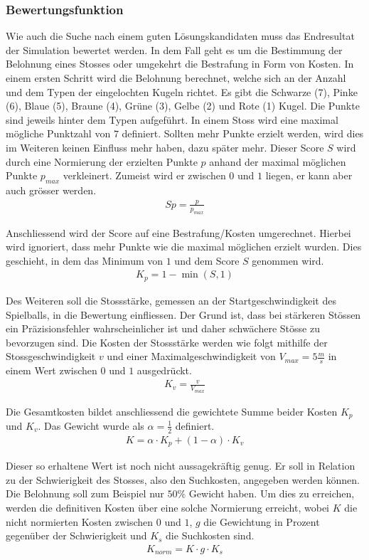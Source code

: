 \subsubsection{Bewertungsfunktion}
Wie auch die Suche nach einem guten Lösungskandidaten muss das Endresultat der Simulation bewertet werden.
In dem Fall geht es um die Bestimmung der Belohnung eines Stosses oder umgekehrt die Bestrafung in Form von Kosten.
In einem ersten Schritt wird die Belohnung berechnet, welche sich an der Anzahl und dem Typen der eingelochten Kugeln richtet.
Es gibt die Schwarze (7), Pinke (6), Blaue (5), Braune (4), Grüne (3), Gelbe (2) und Rote (1) Kugel.
Die Punkte sind jeweils hinter dem Typen aufgeführt.
In einem Stoss wird eine maximal mögliche Punktzahl von $7$ definiert.
Sollten mehr Punkte erzielt werden, wird dies im Weiteren keinen Einfluss mehr haben, dazu später mehr.
Dieser Score $S$ wird durch eine Normierung der erzielten Punkte $p$ anhand der
maximal möglichen Punkte $p_{max}$ verkleinert. Zumeist wird er zwischen $0$ und $1$ liegen, er kann aber auch grösser werden.
\begin{align}
    S{p} = \frac{p}{p_{max}}
\end{align}

Anschliessend wird der Score auf eine Bestrafung/Kosten umgerechnet. Hierbei wird ignoriert, dass mehr Punkte wie die maximal
möglichen erzielt wurden. Dies geschieht, in dem das Minimum von $1$ und dem Score $S$ genommen wird.
\begin{align}
    K_{p} = 1 - \min{(S, 1)}
\end{align}

Des Weiteren soll die Stossstärke, gemessen an der Startgeschwindigkeit des Spielballs, in die Bewertung einfliessen.
Der Grund ist, dass bei stärkeren Stössen ein Präzisionsfehler wahrscheinlicher ist und daher schwächere Stösse zu bevorzugen sind.
Die Kosten der Stossstärke werden wie folgt mithilfe der Stossgeschwindigkeit $v$ und einer
Maximalgeschwindigkeit von $V_{max} = 5\frac{m}{s}$ in einem Wert zwischen $0$ und $1$ ausgedrückt.
\begin{align}
    K_{v} = \frac{v}{V_{max}}
\end{align}

Die Gesamtkosten bildet anschliessend die gewichtete Summe beider Kosten $K_p$ und $K_v$.
Das Gewicht wurde als $\alpha = \frac{1}{2}$ definiert.
\begin{align}
    K = \alpha \cdot K_p + (1 - \alpha) \cdot K_v
\end{align}

Dieser so erhaltene Wert ist noch nicht aussagekräftig genug.
Er soll in Relation zu der Schwierigkeit des Stosses, also den Suchkosten, angegeben werden können.
Die Belohnung soll zum Beispiel nur $50 \%$ Gewicht haben.
Um dies zu erreichen, werden die definitiven Kosten über eine solche Normierung erreicht,
wobei $K$ die nicht normierten Kosten zwischen $0$ und
$1$, $g$ die Gewichtung in Prozent gegenüber der Schwierigkeit und $K_{s}$ die Suchkosten sind.
\begin{align}
    K_{norm} = K \cdot g \cdot K_{s}
\end{align}
